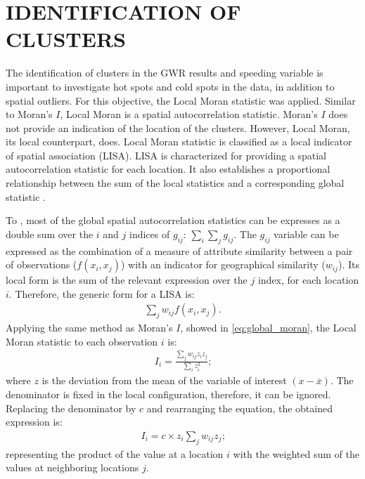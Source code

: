 \section{IDENTIFICATION OF CLUSTERS} \label{sec:cluster}




The identification of clusters in the GWR results and speeding variable is important to investigate hot spots and cold spots in the data, in addition to spatial outliers. For this objective, the Local Moran statistic was applied. Similar to Moran's $I$, Local Moran is a spatial autocorrelation statistic. Moran's $I$ does not provide an indication of the location of the clusters. However, Local Moran, its local counterpart, does. Local Moran statistic is classified as a local indicator of spatial association (LISA). LISA is characterized for providing a spatial autocorrelation statistic for each location. It also establishes a proportional relationship between the sum of the local statistics and a corresponding global statistic \cite{anselinLocalIndicatorsSpatial2010,anselinLocalSpatialAutocorrelation2020}.

To \textcite{anselinLocalSpatialAutocorrelation2020}, most of the global spatial autocorrelation statistics can be expresses as a double sum over the $i$ and $j$ indices of $g_{ij}$: $\sum_i \sum_j g_{ij}$. The $g_{ij}$ variable can be expressed as the combination of a measure of attribute similarity between a pair of observations ($f(x_i, x_j)$) with an indicator for geographical similarity ($w_{ij}$). Its local form is the sum of the relevant expression over the $j$ index, for each location $i$. Therefore, the generic form for a LISA is: \begin{align}
    \sum_j w_{ij} f\left(x_i, x_j\right) \mbox{.}
\end{align} Applying the same method as Moran's $I$, showed in \autoref{eq:global_moran}, the Local Moran statistic to each observation $i$ is: \begin{align}
    I_i = \frac{\sum_j w_{ij} z_i z_j}{\sum_i z_i^2} \mbox{;}
\end{align} where $z$ is the deviation from the mean of the variable of interest $(x - \overline{x})$. The denominator is fixed in the local configuration, therefore, it can be ignored. Replacing the denominator by $c$ and rearranging the equation, the obtained expression is: \begin{align}
    I_i = c \times z_i \sum_j w_{ij} z_j \mbox{;}
\end{align} representing the product of the value at a location $i$ with the weighted sum of the values at neighboring locations $j$.

